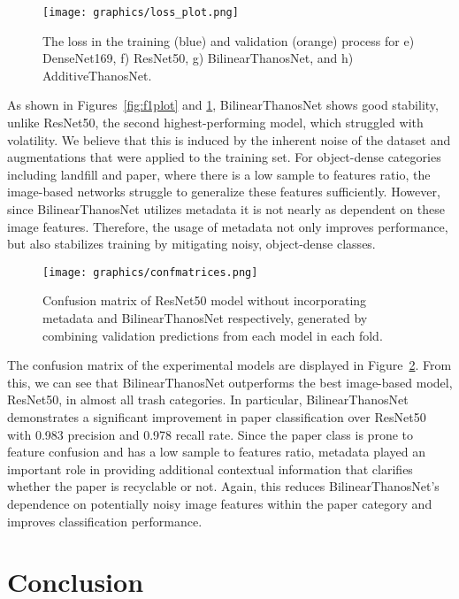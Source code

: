 \documentclass[conference]{ieeeconf}
\begin{document}
\begin{figure}
  \centering
  \texttt{[image: graphics/loss\_plot.png]}
  \caption{The loss in the training (blue) and validation (orange) process for e) DenseNet169, f) ResNet50, g) BilinearThanosNet, and h) AdditiveThanosNet.}
  \label{fig:lossplt}
\end{figure}

As shown in Figures~\ref{fig:f1plot} and \ref{fig:lossplt}, BilinearThanosNet shows good stability, unlike ResNet50, the second highest-performing model, which struggled with volatility. We believe that this is induced by the inherent noise of the dataset and augmentations that were applied to the training set. For object-dense categories including landfill and paper, where there is a low sample to features ratio, the image-based networks struggle to generalize these features sufficiently. However, since BilinearThanosNet utilizes metadata it is not nearly as dependent on these image features. Therefore, the usage of metadata not only improves performance, but also stabilizes training by mitigating noisy, object-dense classes.  
\begin{figure}[t]
  \centering
  \texttt{[image: graphics/confmatrices.png]}
  \caption{Confusion matrix of ResNet50 model without incorporating metadata and BilinearThanosNet respectively, generated by combining validation predictions from each model in each fold.}
  \label{fig:confmatrix}
\end{figure}

The confusion matrix of the experimental models are displayed in Figure~\ref{fig:confmatrix}. From this, we can see that BilinearThanosNet outperforms the best image-based model, ResNet50, in almost all trash categories. In particular, BilinearThanosNet demonstrates a significant improvement in paper classification over ResNet50 with 0.983 precision and 0.978 recall rate. Since the paper class is prone to feature confusion and has a low sample to features ratio, metadata played an important role in providing additional contextual information that clarifies whether the paper is recyclable or not. Again, this reduces BilinearThanosNet's dependence on potentially noisy image features within the paper category and improves classification performance. 

\section{Conclusion}
\end{document}
